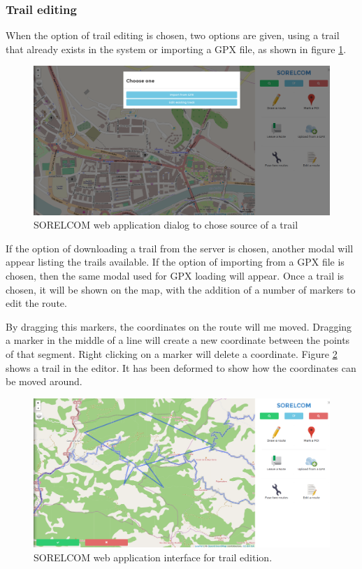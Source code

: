 \subsubsection*{Trail editing}

When the option of trail editing is chosen, two options are given, using a trail that already exists in the system or importing a GPX file, as shown in figure \ref{fig:options}.

\begin{figure}[ht]
  \centering
  \includegraphics[width=.75\textwidth]{fig/trail-import}
  \caption{SORELCOM web application dialog to chose source of a trail}
  \label{fig:options}
\end{figure}

If the option of downloading a trail from the server is chosen, another modal will appear listing the trails available. If the option of importing from a GPX file is chosen, then the same modal used for GPX loading will appear. Once a trail is chosen, it will be shown on the map, with the addition of a number of markers to edit the route.

By dragging this markers, the coordinates on the route will me moved. Dragging a marker in the middle of a line will create a new coordinate between the points of that segment. Right clicking on a marker will delete a coordinate. Figure \ref{fig:trail-edit} shows a trail in the editor. It has been deformed to show how the coordinates can be moved around.

\begin{figure}[ht]
  \centering
  \includegraphics[width=.75\textwidth]{fig/trail-edit}
  \caption{SORELCOM web application interface for trail edition.}
  \label{fig:trail-edit}
\end{figure}

